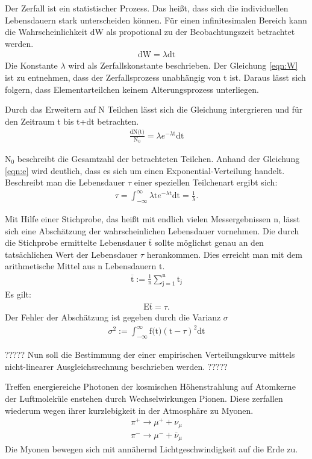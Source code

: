 Der Zerfall ist ein statistischer Prozess. Das heißt, dass sich die individuellen Lebensdauern stark unterscheiden können.
Für einen infinitesimalen Bereich kann die Wahrscheinlichkeit dW als propotional zu der Beobachtungszeit betrachtet werden.
\begin{align}
  \text{dW}=\lambda \text{dt}
  \label{eqn:W}
\end{align}
Die Konstante $\lambda$ wird als Zerfallskonstante beschrieben.
Der Gleichung \ref{eqn:W} ist zu entnehmen, dass der Zerfallsprozess unabhängig von t ist.
Daraus lässt sich folgern, dass Elementarteilchen keinem Alterungsprozess unterliegen.

Durch das Erweitern auf N Teilchen lässt sich die Gleichung intergrieren und für den Zeitraum t bis t+dt betrachten.
\begin{align}
  \frac{\text{dN(t)}}{\text{N}_0}=\lambda e^{-\lambda \text{t}} \text{dt}
  \label{eqn:e}
\end{align}



$\text{N}_0$ beschreibt die Gesamtzahl der betrachteten Teilchen.
Anhand der Gleichung \ref{eqn:e} wird deutlich, dass es sich um einen Exponential-Verteilung handelt.
Beschreibt man die Lebensdauer $\tau$ einer speziellen Teilchenart ergibt sich:
\begin{align*}
  \tau=\int_{-\infty}^{\infty}\lambda \text{t} e^{-\lambda \text{t}}\text{dt}=\frac{1}{\lambda}.
\end{align*}

Mit Hilfe einer Stichprobe, das heißt mit endlich vielen Messergebnissen n, lässt sich eine Abschätzung der wahrscheinlichen Lebensdauer vornehmen.
Die durch die Stichprobe ermittelte Lebensdauer $\overline{\text{t}}$ sollte möglichst genau an den tatsächlichen Wert der Lebensdauer $\tau$ herankommen.
Dies erreicht man mit dem arithmetische Mittel aus n Lebensdauern t.
\begin{align*}
  \overline{\text{t}}:=\frac{1}{\text{n}}\sum_{\text{j}=1}^\text{n}\text{t}_\text{j}
\end{align*}
Es gilt:
\begin{align*}
  \text{E}\overline{\text{t}}=\tau.
\end{align*}
Der Fehler der Abschätzung ist gegeben durch die Varianz $\sigma$
\begin{align*}
  \sigma^2:=\int_{-\infty}^{\infty}\text{f(t)}(\text{t}-\tau)^2\text{dt}
\end{align*}

?????
Nun soll die Bestimmung der einer empirischen Verteilungskurve mittels nicht-linearer Ausgleichsrechnung beschrieben werden.
?????

Treffen energiereiche Photonen der kosmischen Höhenstrahlung auf Atomkerne der Luftmoleküle enstehen durch Wechselwirkungen
Pionen.
Diese zerfallen wiederum wegen ihrer kurzlebigkeit in der Atmosphäre zu Myonen.
\begin{align*}
  \pi^+ \rightarrow \mu^++\nu_\mu\\
  \pi^- \rightarrow \mu^-+\overline{\nu}_\mu
\end{align*}
Die Myonen bewegen sich mit annähernd Lichtgeschwindigkeit auf die Erde zu.
